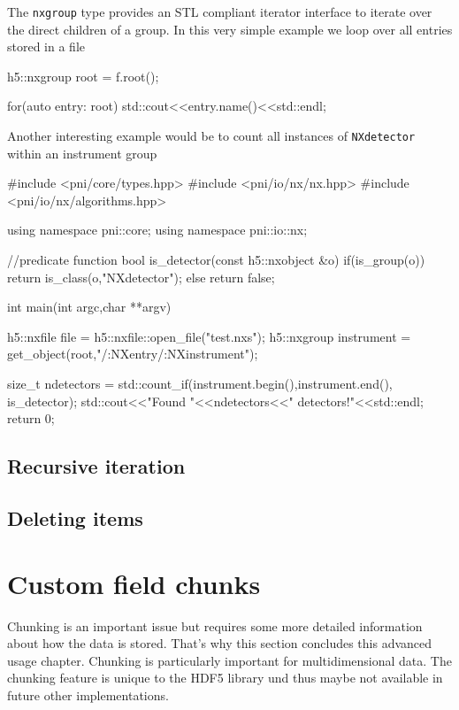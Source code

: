 The {\tt nxgroup} type provides an STL compliant iterator interface to iterate
over the direct children of a group. In this very simple example we loop over 
all entries stored in a file
\begin{cppcode}
h5::nxgroup root = f.root();

for(auto entry: root)
    std::cout<<entry.name()<<std::endl;
\end{cppcode}
Another interesting example would be to count all instances of {\tt NXdetector} 
within an instrument group
\begin{cppcode}
#include <pni/core/types.hpp>
#include <pni/io/nx/nx.hpp>
#include <pni/io/nx/algorithms.hpp>

using namespace pni::core;
using namespace pni::io::nx;

//predicate function
bool is_detector(const h5::nxobject &o)
{
    if(is_group(o)) return is_class(o,"NXdetector");
    else return false;
}

int main(int argc,char **argv)
{
    h5::nxfile file = h5::nxfile::open_file("test.nxs");
    h5::nxgroup instrument = get_object(root,"/:NXentry/:NXinstrument");

    size_t ndetectors = std::count_if(instrument.begin(),instrument.end(),
                                      is_detector);
    std::cout<<"Found "<<ndetectors<<" detectors!"<<std::endl;
    return 0;
}
\end{cppcode}

\subsection{Recursive iteration}

\subsection{Deleting items}


\section{Custom field chunks}\label{section:field_chunks}

Chunking is an important issue but requires some more detailed information about
how the data is stored. That's why this section concludes this advanced usage
chapter. Chunking is particularly important for multidimensional data. 
The chunking feature is unique to the HDF5 library und thus maybe not available 
in future other implementations.

